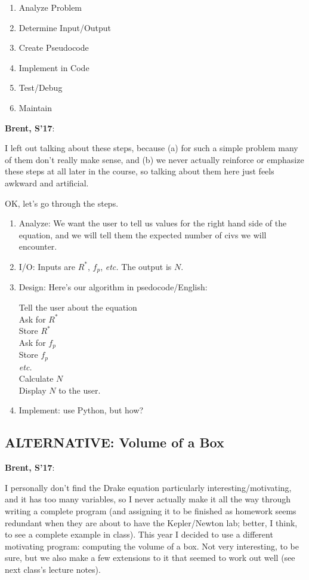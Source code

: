 \documentclass{article}
\newcommand{\etc}{\emph{etc.}\xspace}
\newenvironment{reflect}[1]
{
  \noindent
  \begin{lrbox}{\reflectbox}
    \begin{minipage}[t]{\textwidth}
      \textbf{#1}:
}{
    \end{minipage}
  \end{lrbox}
  \fbox{\usebox{\reflectbox}}
}
\begin{document}
\begin{enumerate}
\item Analyze Problem
\item Determine Input/Output
\item Create Pseudocode
\item Implement in Code
\item Test/Debug
\item Maintain
\end{enumerate}

\begin{reflect}{Brent, S'17}
  I left out talking about these steps, because (a) for such a simple
  problem many of them don't really make sense, and (b) we never
  actually reinforce or emphasize these steps at all later in the
  course, so talking about them here just feels awkward and artificial.
\end{reflect}

OK, let's go through the steps.

\begin{enumerate}
\item Analyze: We want the user to tell us values for the right hand
  side of the equation, and we will tell them the expected number of
  civs we will encounter.

\item I/O: Inputs are $R^*$, $f_p$, \etc  The output is $N$.

\item Design: Here's our algorithm in psedocode/English:

  Tell the user about the equation \\
  Ask for $R^*$ \\
  Store $R^*$ \\
  Ask for $f_p$ \\
  Store $f_p$ \\
  \etc \\
  Calculate $N$ \\
  Display $N$ to the user.

\item Implement: use Python, but how?

\end{enumerate}

\subsection*{ALTERNATIVE: Volume of a Box}

\begin{reflect}{Brent, S'17}
  I personally don't find the Drake equation particularly
  interesting/motivating, and it has too many variables, so I never
  actually make it all the way through writing a complete program (and
  assigning it to be finished as homework seems redundant when they
  are about to have the Kepler/Newton lab; better, I think, to see a
  complete example in class).  This year I decided to use a different
  motivating program: computing the volume of a box. Not very
  interesting, to be sure, but we also make a few extensions to it
  that seemed to work out well (see next class's lecture notes).
\end{reflect}
\end{document}
